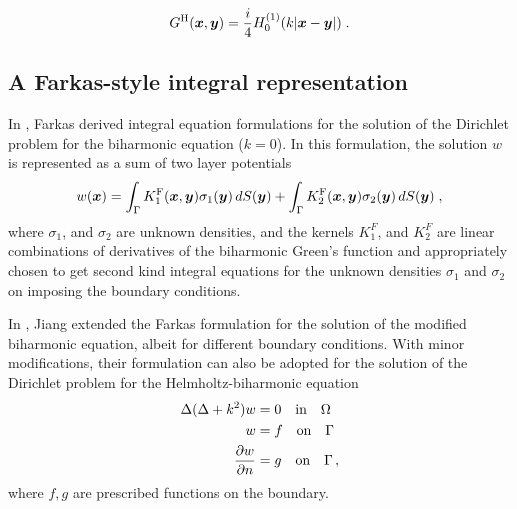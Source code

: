 \begin{equation}
  G^{\textrm{H}}({\boldsymbol x},{\boldsymbol y}) = \frac{i}{4} H_0^{(1)}(k|{\boldsymbol x}-{\boldsymbol y}|) \; .
\end{equation}

\subsection{A Farkas-style integral representation}

In \cite{Farkas89}, Farkas derived integral equation formulations
for the solution of the Dirichlet problem for the biharmonic equation ($k=0$). 
In this formulation, the solution 
$w$ is represented as a sum of two layer potentials
\begin{equation}
  w({\boldsymbol x}) = \int_\Gamma K^{\textrm{F}}_1 ({\boldsymbol x},{\boldsymbol y}) \sigma_1({\boldsymbol y}) \, dS({\boldsymbol y})
  + \int_\Gamma K^{\textrm{F}}_2({\boldsymbol x},{\boldsymbol y}) \sigma_2({\boldsymbol y}) \, dS({\boldsymbol y}) \; ,
  \label{eq:farkRep}
\end{equation}
where $\sigma_{1}$, and $\sigma_{2}$ are unknown densities, and the kernels
$K_{1}^{F}$, and $K_{2}^{F}$ are linear combinations of derivatives of
the biharmonic Green's function and appropriately chosen to get second kind integral equations
for the unknown densities $\sigma_{1}$ and $\sigma_{2}$ on imposing the boundary conditions.

In \cite{jiang2013second}, Jiang extended the Farkas formulation for the solution of the modified
biharmonic equation, albeit for different boundary conditions. With minor modifications, their formulation
can also be adopted for the solution of the Dirichlet problem for the Helmholtz-biharmonic equation
\begin{align}
\Delta (\Delta + k^2) w &= 0 \quad \text{in} \quad \Omega \label{eq:helmbi} \\
w &= f \quad \text{on} \quad \Gamma \label{eq:helmbibc1} \\
\frac{\partial w}{\partial n} &=g \quad \text{on} \quad \Gamma \label{eq:helmbibc2} \,,
\end{align}
where $f,g$ are prescribed functions on the boundary. 

